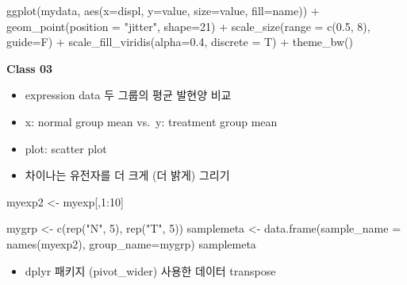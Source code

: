 \documentclass[
]{book}
\newenvironment{Shaded}{\begin{snugshade}}{\end{snugshade}}
\newcommand{\AttributeTok}[1]{\textcolor[rgb]{0.77,0.63,0.00}{#1}}
\newcommand{\DecValTok}[1]{\textcolor[rgb]{0.00,0.00,0.81}{#1}}
\newcommand{\FloatTok}[1]{\textcolor[rgb]{0.00,0.00,0.81}{#1}}
\newcommand{\FunctionTok}[1]{\textcolor[rgb]{0.00,0.00,0.00}{#1}}
\newcommand{\NormalTok}[1]{#1}
\newcommand{\OtherTok}[1]{\textcolor[rgb]{0.56,0.35,0.01}{#1}}
\newcommand{\SpecialCharTok}[1]{\textcolor[rgb]{0.00,0.00,0.00}{#1}}
\newcommand{\StringTok}[1]{\textcolor[rgb]{0.31,0.60,0.02}{#1}}
\providecommand{\tightlist}{%
  \setlength{\itemsep}{0pt}\setlength{\parskip}{0pt}}
\begin{document}
\begin{Shaded}
\begin{Highlighting}[]
\FunctionTok{ggplot}\NormalTok{(mydata, }\FunctionTok{aes}\NormalTok{(}\AttributeTok{x=}\NormalTok{displ, }\AttributeTok{y=}\NormalTok{value, }\AttributeTok{size=}\NormalTok{value, }\AttributeTok{fill=}\NormalTok{name)) }\SpecialCharTok{+}
  \FunctionTok{geom\_point}\NormalTok{(}\AttributeTok{position =} \StringTok{"jitter"}\NormalTok{, }\AttributeTok{shape=}\DecValTok{21}\NormalTok{) }\SpecialCharTok{+}
  \FunctionTok{scale\_size}\NormalTok{(}\AttributeTok{range =} \FunctionTok{c}\NormalTok{(}\FloatTok{0.5}\NormalTok{, }\DecValTok{8}\NormalTok{), }\AttributeTok{guide=}\NormalTok{F) }\SpecialCharTok{+}
  \FunctionTok{scale\_fill\_viridis}\NormalTok{(}\AttributeTok{alpha=}\FloatTok{0.4}\NormalTok{, }\AttributeTok{discrete =}\NormalTok{ T) }\SpecialCharTok{+}
  \FunctionTok{theme\_bw}\NormalTok{()}
\end{Highlighting}
\end{Shaded}

\textbf{Class 03}

\begin{itemize}
\tightlist
\item
  expression data 두 그룹의 평균 발현양 비교
\item
  x: normal group mean vs.~y: treatment group mean
\item
  plot: scatter plot
\item
  차이나는 유전자를 더 크게 (더 밝게) 그리기
\end{itemize}

\begin{Shaded}
\begin{Highlighting}[]

\NormalTok{myexp2 }\OtherTok{\textless{}{-}}\NormalTok{ myexp[,}\DecValTok{1}\SpecialCharTok{:}\DecValTok{10}\NormalTok{]}

\NormalTok{mygrp }\OtherTok{\textless{}{-}} \FunctionTok{c}\NormalTok{(}\FunctionTok{rep}\NormalTok{(}\StringTok{"N"}\NormalTok{, }\DecValTok{5}\NormalTok{), }\FunctionTok{rep}\NormalTok{(}\StringTok{"T"}\NormalTok{, }\DecValTok{5}\NormalTok{))}
\NormalTok{samplemeta }\OtherTok{\textless{}{-}} \FunctionTok{data.frame}\NormalTok{(}\AttributeTok{sample\_name =} \FunctionTok{names}\NormalTok{(myexp2), }\AttributeTok{group\_name=}\NormalTok{mygrp)}
\NormalTok{samplemeta}
\end{Highlighting}
\end{Shaded}

\begin{itemize}
\tightlist
\item
  dplyr 패키지 (pivot\_wider) 사용한 데이터 transpose
\end{itemize}
\end{document}
